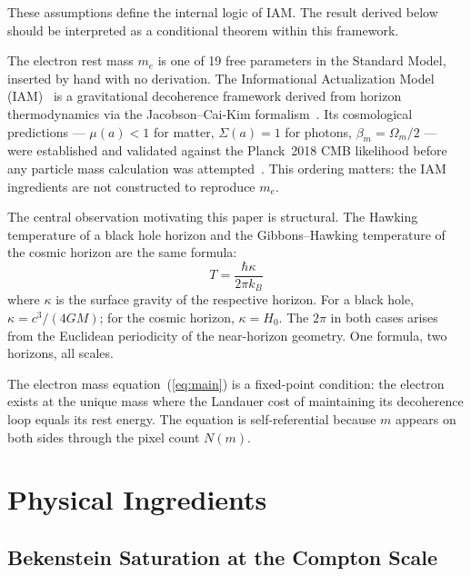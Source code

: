 \documentclass[12pt,a4paper]{article}
\begin{document}
These assumptions define the internal logic of IAM. The result derived below 
should be interpreted as a conditional theorem within this framework.


The electron rest mass $m_e$ is one of 19 free parameters in the Standard Model,
inserted by hand with no derivation. The Informational Actualization Model
(IAM)~\cite{iam_theory} is a gravitational decoherence framework derived from
horizon thermodynamics via the Jacobson--Cai-Kim
formalism~\cite{jacobson1995,cai2005}. Its cosmological predictions --- $\mu(a)
< 1$ for matter, $\Sigma(a) = 1$ for photons, $\beta_m = \Omega_m/2$ --- were
established and validated against the Planck~2018 CMB likelihood before any
particle mass calculation was attempted~\cite{iam_obs}. This ordering matters:
the IAM ingredients are not constructed to reproduce $m_e$.

The central observation motivating this paper is structural. The Hawking
temperature of a black hole horizon and the Gibbons--Hawking temperature of the
cosmic horizon are the same formula:
\begin{equation}
T = \frac{\hbar\kappa}{2\pi k_B}
\label{eq:horizon_T}
\end{equation}
where $\kappa$ is the surface gravity of the respective horizon. For a black
hole, $\kappa = c^3/(4GM)$; for the cosmic horizon, $\kappa = H_0$. The $2\pi$
in both cases arises from the Euclidean periodicity of the near-horizon
geometry. One formula, two horizons, all scales.

The electron mass equation~(\ref{eq:main}) is a fixed-point condition: the
electron exists at the unique mass where the Landauer cost of maintaining its
decoherence loop equals its rest energy. The equation is self-referential
because $m$ appears on both sides through the pixel count $N(m)$.

\section{Physical Ingredients}

\subsection{Bekenstein Saturation at the Compton Scale}
\end{document}
